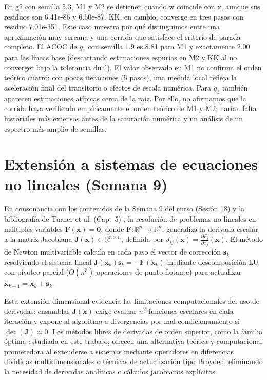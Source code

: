 \documentclass[10pt,a4paper]{article}
\begin{document}
En g2 con semilla 5.3, M1 y M2 se detienen cuando w coincide con x, aunque sus residuos son 6.41e-86 y 6.60e-87. KK, en cambio, converge en tres pasos con residuo 7.01e-351. Este caso muestra por qué distinguimos entre una aproximación muy cercana y una corrida que satisface el criterio de parada completo.
El ACOC de $g_1$ con semilla $1.9$ es 8.81 para M1 y exactamente 2.00 para las l\'ineas base (descartando estimaciones espurias en M2 y KK al no converger bajo la tolerancia dual). El valor observado en M1 no confirma el orden teórico cuatro: con pocas iteraciones (5 pasos), una medida local refleja la aceleración final del transitorio o efectos de escala numérica. Para $g_3$ también aparecen estimaciones atípicas cerca de la ra\'iz. Por ello, no afirmamos que la corrida haya verificado empíricamente el orden te\'orico de M1 y M2; harían falta historiales más extensos antes de la saturación numérica y un an\'alisis de un espectro más amplio de semillas.

\section{Extensi\'on a sistemas de ecuaciones no lineales (Semana 9)}
En consonancia con los contenidos de la Semana 9 del curso (Sesión 18) y la bibliograf\'ia de Turner et al. (Cap.~5) \cite{turner}, la resoluci\'on de problemas no lineales en m\'ultiples variables $\mathbf{F}(\mathbf{x}) = \mathbf{0}$, donde $\mathbf{F}: \mathbb{R}^n \to \mathbb{R}^n$, generaliza la derivada escalar a la matriz Jacobiana $\mathbf{J}(\mathbf{x}) \in \mathbb{R}^{n \times n}$, definida por $J_{ij}(\mathbf{x}) = \frac{\partial F_i}{\partial x_j}(\mathbf{x})$. El m\'etodo de Newton multivariable calcula en cada paso el vector de correcci\'on $\mathbf{s}_k$ resolviendo el sistema lineal $\mathbf{J}(\mathbf{x}_k)\mathbf{s}_k = -\mathbf{F}(\mathbf{x}_k)$ mediante descomposici\'on LU con pivoteo parcial ($O(n^3)$ operaciones de punto flotante) para actualizar $\mathbf{x}_{k+1} = \mathbf{x}_k + \mathbf{s}_k$.

Esta extensi\'on dimensional evidencia las limitaciones computacionales del uso de derivadas: ensamblar $\mathbf{J}(\mathbf{x})$ exige evaluar $n^2$ funciones escalares en cada iteraci\'on y expone al algoritmo a divergencias por mal condicionamiento si $\det(\mathbf{J})\approx 0$. Los m\'etodos libres de derivadas de orden superior, como la familia \'optima estudiada en este trabajo, ofrecen una alternativa te\'orica y computacional prometedora al extenderse a sistemas mediante operadores en diferencias divididas multidimensionales o t\'ecnicas de actualizaci\'on tipo Broyden, eliminando la necesidad de derivadas anal\'iticas o c\'alculos jacobianos expl\'icitos.
\end{document}
